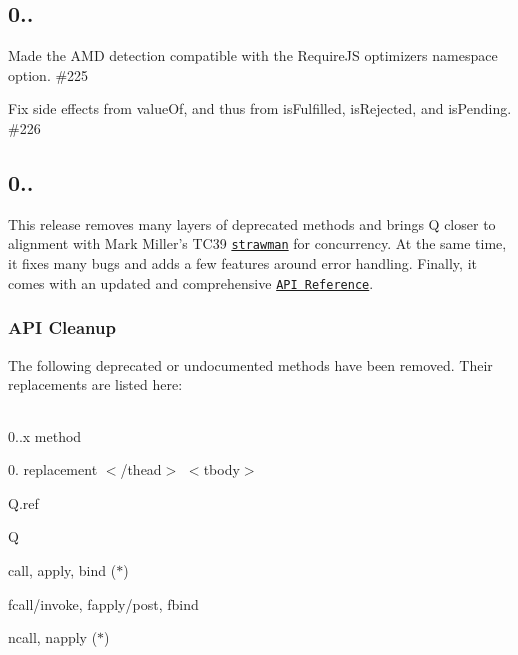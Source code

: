 \subsection*{0..}


\begin{DoxyItemize}
\item Made the A\+MD detection compatible with the Require\+JS optimizer\textquotesingle{}s {\ttfamily namespace} option. \#225 
\item Fix side effects from {\ttfamily value\+Of}, and thus from {\ttfamily is\+Fulfilled}, {\ttfamily is\+Rejected}, and {\ttfamily is\+Pending}. \#226 
\end{DoxyItemize}

\subsection*{0..}

This release removes many layers of deprecated methods and brings Q closer to alignment with Mark Miller’s T\+C39 \href{http://wiki.ecmascript.org/doku.php?id=strawman:concurrency}{\tt strawman} for concurrency. At the same time, it fixes many bugs and adds a few features around error handling. Finally, it comes with an updated and comprehensive \href{https://github.com/kriskowal/q/wiki/API-Reference}{\tt A\+PI Reference}.

\subsubsection*{A\+PI Cleanup}

The following deprecated or undocumented methods have been removed. Their replacements are listed here\+:

\tabulinesep=1mm
\begin{longtabu} spread 0pt [c]{*{0}{|X[-1]}|}
\hline
\end{longtabu}


0..\+x method 

0. replacement  $<$/thead$>$ $<$tbody$>$ 

{\ttfamily Q.\+ref} 

{\ttfamily Q}  

{\ttfamily call}, {\ttfamily apply}, {\ttfamily bind} ($\ast$) 

{\ttfamily fcall}/{\ttfamily invoke}, {\ttfamily fapply}/{\ttfamily post}, {\ttfamily fbind}  

{\ttfamily ncall}, {\ttfamily napply} ($\ast$) 

